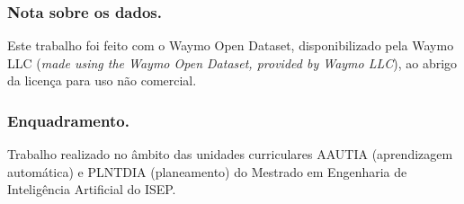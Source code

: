 \subsubsection*{Nota sobre os dados.}
Este trabalho foi feito com o Waymo Open Dataset, disponibilizado pela
Waymo LLC (\emph{made using the Waymo Open Dataset, provided by Waymo
LLC}), ao abrigo da licença para uso não comercial.

\subsubsection*{Enquadramento.}
Trabalho realizado no âmbito das unidades curriculares AAUTIA
(aprendizagem automática) e PLNTDIA (planeamento) do Mestrado em
Engenharia de Inteligência Artificial do ISEP.
